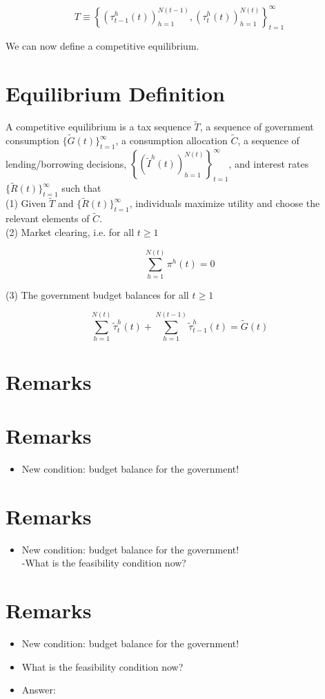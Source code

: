 \documentclass[10pt]{article}
\begin{document}
$$
T \equiv\left\{\left(\tau_{t-1}^{h}(t)\right)_{h=1}^{N(t-1)},\left(\tau_{t}^{h}(t)\right)_{h=1}^{N(t)}\right\}_{t=1}^{\infty}
$$

We can now define a competitive equilibrium.

\section*{Equilibrium Definition}
A competitive equilibrium is a tax sequence $\widetilde{T}$, a sequence of government consumption $\{\widetilde{G}(t)\}_{t=1}^{\infty}$, a consumption allocation $\widetilde{C}$, a sequence of lending/borrowing decisions, $\left\{\left(\widetilde{I}^{h}(t)\right)_{h=1}^{N(t)}\right\}_{t=1}^{\infty}$, and interest rates $\{\widetilde{R}(t)\}_{t=1}^{\infty}$ such that\\
(1) Given $\widetilde{T}$ and $\{\widetilde{R}(t)\}_{t=1}^{\infty}$, individuals maximize utility and choose the relevant elements of $\widetilde{C}$.\\
(2) Market clearing, i.e. for all $t \geq 1$

$$
\sum_{h=1}^{N(t)} \pi^{h}(t)=0
$$

(3) The government budget balances for all $t \geq 1$

$$
\sum_{h=1}^{N(t)} \widetilde{\tau}_{t}^{h}(t)+\sum_{h=1}^{N(t-1)} \widetilde{\tau}_{t-1}^{h}(t)=\widetilde{G}(t)
$$

\section*{Remarks}
\section*{Remarks}
\begin{itemize}
  \item New condition: budget balance for the government!
\end{itemize}

\section*{Remarks}
\begin{itemize}
  \item New condition: budget balance for the government!\\
-What is the feasibility condition now?
\end{itemize}

\section*{Remarks}
\begin{itemize}
  \item New condition: budget balance for the government!
  \item What is the feasibility condition now?
  \item Answer:
\end{itemize}
\end{document}
